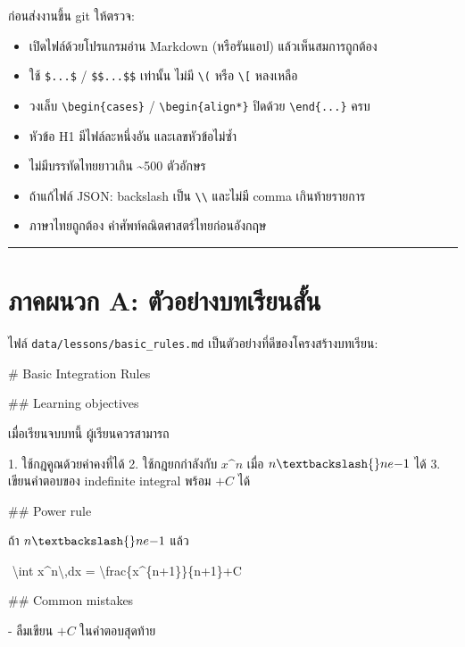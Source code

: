 \documentclass[
  thai,
  12pt,
  letterpaper,
  DIV=11,
  numbers=noendperiod]{scrartcl}
\newenvironment{Shaded}{\begin{snugshade}}{\end{snugshade}}
\newcommand{\FunctionTok}[1]{\textcolor[rgb]{0.28,0.35,0.67}{#1}}
\newcommand{\NormalTok}[1]{\textcolor[rgb]{0.00,0.23,0.31}{#1}}
\newcommand{\SpecialStringTok}[1]{\textcolor[rgb]{0.13,0.47,0.30}{#1}}
\providecommand{\tightlist}{%
  \setlength{\itemsep}{0pt}\setlength{\parskip}{0pt}}
\begin{document}
ก่อนส่งงานขึ้น git ให้ตรวจ:

\begin{itemize}
\tightlist
\item[$\square$]
  เปิดไฟล์ด้วยโปรแกรมอ่าน Markdown (หรือรันแอป) แล้วเห็นสมการถูกต้อง
\item[$\square$]
  ใช้ \texttt{\$...\$} / \texttt{\$\$...\$\$} เท่านั้น ไม่มี
  \texttt{\textbackslash{}(} หรือ \texttt{\textbackslash{}{[}} หลงเหลือ
\item[$\square$]
  วงเล็บ \texttt{\textbackslash{}begin\{cases\}} /
  \texttt{\textbackslash{}begin\{align*\}} ปิดด้วย
  \texttt{\textbackslash{}end\{...\}} ครบ
\item[$\square$]
  หัวข้อ H1 มีไฟล์ละหนึ่งอัน และเลขหัวข้อไม่ซ้ำ
\item[$\square$]
  ไม่มีบรรทัดไทยยาวเกิน \textasciitilde500 ตัวอักษร
\item[$\square$]
  ถ้าแก้ไฟล์ JSON: backslash เป็น \texttt{\textbackslash{}\textbackslash{}}
  และไม่มี comma เกินท้ายรายการ
\item[$\square$]
  ภาษาไทยถูกต้อง คำศัพท์คณิตศาสตร์ไทยก่อนอังกฤษ
\end{itemize}

\begin{center}\rule{0.5\linewidth}{0.5pt}\end{center}

\section{ภาคผนวก A:
ตัวอย่างบทเรียนสั้น}\label{uxe20uxe32uxe04uxe1cuxe19uxe27uxe01-a-uxe15uxe27uxe2duxe22uxe32uxe07uxe1auxe17uxe40uxe23uxe22uxe19uxe2auxe19}

ไฟล์ \texttt{data/lessons/basic\_rules.md} เป็นตัวอย่างที่ดีของโครงสร้างบทเรียน:

\begin{Shaded}
\begin{Highlighting}[]
\FunctionTok{\# Basic Integration Rules}

\FunctionTok{\#\# Learning objectives}

\NormalTok{เมื่อเรียนจบบทนี้ ผู้เรียนควรสามารถ}

\SpecialStringTok{1. }\NormalTok{ใช้กฎคูณด้วยค่าคงที่ได้}
\SpecialStringTok{2. }\NormalTok{ใช้กฎยกกำลังกับ $x\^{}n$ เมื่อ $n\textbackslash{}ne {-}1$ ได้}
\SpecialStringTok{3. }\NormalTok{เขียนคำตอบของ indefinite integral พร้อม $+C$ ได้}

\FunctionTok{\#\# Power rule}

\NormalTok{ถ้า $n\textbackslash{}ne {-}1$ แล้ว}

\NormalTok{$$}
\NormalTok{\textbackslash{}int x\^{}n\textbackslash{},dx = \textbackslash{}frac\{x\^{}\{n+1\}\}\{n+1\}+C}
\NormalTok{$$}

\FunctionTok{\#\# Common mistakes}

\SpecialStringTok{{-} }\NormalTok{ลืมเขียน $+C$ ในคำตอบสุดท้าย}
\end{Highlighting}
\end{Shaded}
\end{document}
